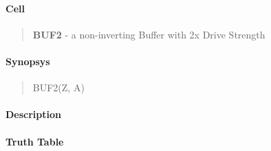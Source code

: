 \label{BUF2}
\paragraph{Cell}
\begin{quote}
    \textbf{BUF2} - a non-inverting Buffer with 2x Drive Strength
\end{quote}

\paragraph{Synopsys}
\begin{quote}
    BUF2(Z, A)
\end{quote}

\paragraph{Description}



\paragraph{Truth Table}


